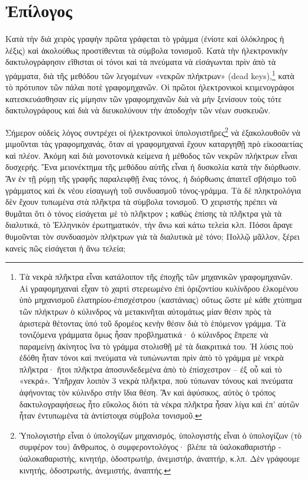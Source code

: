 \documentclass[12pt,a4paper]{article}
\begin{document}
\section*{Ἐπίλογος}
  Κατὰ τὴν διὰ χειρὸς γραφὴν πρῶτα γράφεται τὸ γράμμα (ἐνίοτε καὶ ὁλόκληρος
  ἡ λέξις) καὶ  ἀκολούθως προστίθενται τὰ σύμβολα τονισμοῦ.  Κατὰ τὴν
  ἠλεκτρονικὴν δακτυλογράφησιν εἴθισται οἱ τόνοι καὶ τὰ πνεύματα νὰ
  εἰσάγωνται πρὶν ἀπὸ τὰ γράμματα, διὰ τῆς μεθόδου τῶν λεγομένων «νεκρῶν
  πλήκτρων» 
  (dead keys),\footnote{
      Τὰ νεκρὰ πλῆκτρα εἶναι κατάλοιπον τῆς ἐποχῆς τῶν μηχανικῶν
      γραφομηχανῶν. Αἱ γραφομηχαναὶ εἶχαν τὸ χαρτὶ στερεωμένο ἐπὶ
      ὁριζοντίου κυλίνδρου ἑλκομένου ὑπὸ μηχανισμοῦ ἐλατηρίου-ἐπισχέστρου
      (καστάνιας) οὕτως ὥστε μὲ κάθε χτύπημα τῶν πλήκτρων ὁ κύλινδρος νὰ
      μετακινῆται αὐτομάτως μίαν θέσιν πρὸς τὰ ἀριστερὰ θέτοντας ὑπό τοῦ
      δρομέος κενὴν θέσιν διὰ τὸ ἑπόμενον γράμμα.  Τὰ τονιζόμενα γράμματα
      ὅμως ἦσαν προβληματικά·  ὁ κύλινδρος  ἔπρεπε νὰ παραμείνῃ ἀκίνητος
      ἵνα τὸ γράμμα στολισθῇ μὲ τὰ διακριτικά του.  Ἡ λύσις ποὺ ἐδόθη ἦταν
      τόνοι καὶ πνεύματα νὰ τυπώνωνται πρὶν ἀπὸ τὸ γράμμα μὲ νεκρὰ πλῆκτρα·
      ἤτοι πλῆκτρα ἀποσυνδεδεμένα ἀπὸ τὸ ἐπίσχεστρον – ἐξ οὗ καὶ τὸ
      «νεκρά».  Ὑπῆρχαν λοιπὸν 3 νεκρὰ πλῆκτρα, ποὺ τύπωναν τόνους καὶ
      πνεύματα ἀφήνοντας τὸν κύλινδρο στὴν ἴδια θέση.  Ἂν καὶ ἀφύσικος,
      αὐτὸς ὁ τρόπος δακτυλογραφήσεως ἧτο  εὔκολος διότι τὰ νέκρα πλῆκτρα
      ἦσαν λίγα καὶ ἐπ’ αὐτῶν ἦταν ἐντυπωμένα τὰ ἀντίστοιχα σύμβολα τονισμοῦ.
      } 
  κατὰ τὸ πρότυπον
  τῶν πάλαι ποτὲ γραφομηχανῶν. Οἱ πρῶτοι ἠλεκτρονικοὶ κειμενογράφοι
  κατεσκευάσθησαν εἰς μίμησιν τῶν γραφομηχανῶν διὰ νὰ μὴν ξενίσουν τοὺς
  τότε δακτυλογράφους καὶ διὰ νὰ διευκολύνουν τὴν ἀποδοχὴν τῶν νέων
  συσκευῶν.

  Σήμερον οὐδεὶς λόγος συντρέχει οἱ ἠλεκτρονικοὶ ὑπολογιστῆρες\footnote{
    Ὑπολογιστὴρ εἶναι ὁ ὑπολογίζων μηχανισμός, ὑπολογιστὴς εἶναι
    ὁ ὑπολογίζων (τὸ συμφέρον του) ἄνθρωπος, ὁ συμφεροντολόγος· βλέπε τὰ
    ὑαλοκαθαριστήρ - ὑαλοκαθαριστής, κινητήρ, ὁδοστρωτήρ, ἀνεμιστήρ,
    ἀναπτήρ, κ.λπ. Δὲν γράφουμε κινητής, ὁδοστρωτής, ἀνεμιστής, ἀναπτής.
  } νὰ ἐξακολουθοῦν νὰ μιμοῦνται τὰς γραφομηχανάς, ὅταν αἱ γραφομηχαναὶ
  ἔχουν καταργηθῇ πρὸ εἰκοσαετίας καὶ πλέον.  Ἀκόμη καὶ διὰ μονοτονικὰ
  κείμενα ἡ μέθοδος τῶν νεκρῶν πλήκτρων εἶναι δυσχερής.  Ἕνα μειονέκτημα
  τῆς μεθόδου αὐτῆς εἶναι ἡ δυσκολία κατὰ τὴν διόρθωσιν.  Ἂν ἐν τῇ ρύμῃ τῆς
  γραφῆς παραλειφθῇ ἕνας τόνος, ἡ διόρθωσις ἀπαιτεῖ σβήσιμο τοῦ γράμματος
  καὶ ἐκ νέου εἰσαγωγὴ τοῦ συνδυασμοῦ τόνος-γράμμα.  Τὰ δὲ πληκτρολόγια δὲν
  ἔχουν τυπωμένα στὰ πλῆκτρα τὰ σύμβολα τονισμοῦ. Ὁ χειριστὴς πρέπει νὰ
  θυμᾶται ὅτι ὁ τόνος εἰσάγεται μὲ τὸ πλῆκτρον {\bf;}  καθὼς ἐπίσης τὰ
  πλῆκτρα γιὰ τὰ διαλυτικά, τὸ Ἑλληνικὸν ἐρωτηματικόν, τὴν ἄνω καὶ κάτω
  τελεία κλπ. Πόσοι ἄραγε θυμοῦνται τὸν συνδυασμὸν πλήκτρων γιὰ τὰ
  διαλυτικὰ μὲ τόνο; Πολλῷ μᾶλλον, ξέρει κανεὶς πῶς εἰσάγεται ἡ ἄνω τελεία;
\end{document}
